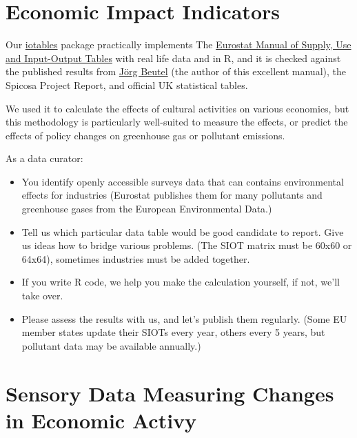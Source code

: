 \documentclass[
  a4paper,
  openany, a4paper, oneside]{book}
\providecommand{\tightlist}{%
  \setlength{\itemsep}{0pt}\setlength{\parskip}{0pt}}
\begin{document}
\hypertarget{economic-impact-indicators}{%
\section{Economic Impact Indicators}\label{economic-impact-indicators}}

Our \href{https://iotables.dataobservatory.eu/}{iotables} package practically implements The \href{https://ec.europa.eu/eurostat/en/web/products-manuals-and-guidelines/-/KS-RA-07-013}{Eurostat Manual of Supply, Use and Input-Output Tables} with real life data and in R, and it is checked against the published results from \href{http://ec.europa.eu/eurostat/documents/3859598/5902113/KS-RA-07-013-EN.PDF/b0b3d71e-3930-4442-94be-70b36cea9b39?version=1.0}{Jörg Beutel} (the author of this excellent manual), the Spicosa Project Report, and official UK statistical tables.

We used it to calculate the effects of cultural activities on various economies, but this methodology is particularly well-suited to measure the effects, or predict the effects of policy changes on greenhouse gas or pollutant emissions.

As a data curator:

\begin{itemize}
\tightlist
\item
  You identify openly accessible surveys data that can contains environmental effects for industries (Eurostat publishes them for many pollutants and greenhouse gases from the European Environmental Data.)
\item
  Tell us which particular data table would be good candidate to report. Give us ideas how to bridge various problems. (The SIOT matrix must be 60x60 or 64x64), sometimes industries must be added together.
\item
  If you write R code, we help you make the calculation yourself, if not, we'll take over.\\
\item
  Please assess the results with us, and let's publish them regularly. (Some EU member states update their SIOTs every year, others every 5 years, but pollutant data may be available annually.)
\end{itemize}

\hypertarget{sensory-data-measuring-changes-in-economic-activy}{%
\section{Sensory Data Measuring Changes in Economic Activy}\label{sensory-data-measuring-changes-in-economic-activy}}
\end{document}
